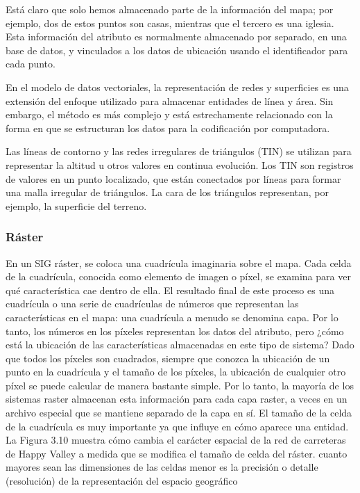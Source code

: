 
Está claro que solo hemos almacenado parte de la información del mapa; por ejemplo, dos de estos puntos son casas, mientras que el tercero es una iglesia. Esta información del atributo es normalmente almacenado por separado, en una base de datos, y vinculados a los datos de ubicación usando el identificador para cada punto. 


En el modelo de datos vectoriales, la representación de redes y superficies es una extensión del enfoque utilizado para almacenar entidades de línea y área. Sin embargo, el método es más complejo y está estrechamente relacionado con la forma en que se estructuran los datos para la codificación por computadora.

Las líneas de contorno y las redes irregulares de triángulos (TIN) se utilizan para representar la altitud u otros valores en continua evolución. Los TIN son registros de valores en un punto localizado, que están conectados por líneas para formar una malla irregular de triángulos. La cara de los triángulos representan, por ejemplo, la superficie del terreno.

\subsubsection{Ráster}

En un SIG ráster, se coloca una cuadrícula imaginaria sobre el mapa. Cada celda de la cuadrícula, conocida como elemento de imagen o píxel, se examina para ver qué característica cae dentro de ella. El resultado final de este proceso es una cuadrícula o una serie de cuadrículas de números que representan las características en el mapa: una cuadrícula a menudo se denomina capa. Por lo tanto, los números en los píxeles representan los datos del atributo, pero ¿cómo está la ubicación de las características almacenadas en este tipo de sistema? Dado que todos los píxeles son cuadrados, siempre que conozca la ubicación de un punto en la cuadrícula y el tamaño de los píxeles, la ubicación de cualquier otro píxel se puede calcular de manera bastante simple. Por lo tanto, la mayoría de los sistemas raster almacenan esta información para cada capa raster, a veces en un archivo especial que se mantiene separado de la capa en sí.
El tamaño de la celda de la cuadrícula es muy importante ya que influye en cómo aparece una entidad. La Figura 3.10 muestra cómo cambia el carácter espacial de la red de carreteras de Happy Valley a medida que se modifica el tamaño de celda del ráster.
cuanto mayores sean las dimensiones de las celdas menor es la precisión o detalle (resolución) de la representación del espacio geográfico

